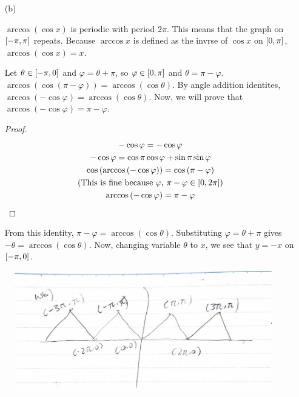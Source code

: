 \documentclass{article}
\begin{document}
\begin{multicols}{2}
\begin{itemize}
	\item[(b)]
	\begin{flushleft}	
	$\arccos\left(\cos x\right)$ is periodic with period $2\pi$.
	This means that the graph on $\interval[scaled]{-\pi}{\pi}$
	repeats. Because $\arccos x$ is defined as the invrse of
	$\cos x$ on $\interval[scaled]{0}{\pi}$, $\arccos\left(
	\cos x\right)=x$.
	
	Let $\theta\in\interval[scaled]{-\pi}{0}$ and
	$\varphi=\theta+\pi$, so $\varphi\in\interval[scaled]
	{0}{\pi}$ and $\theta=\pi-\varphi$. $\arccos\left(\cos\left(
	\pi-\varphi\right)\right)=\arccos\left(\cos\theta\right)$. By
	angle addition identites, $\arccos\left(-\cos\varphi\right)=
	\arccos\left(\cos\theta\right)$. Now, we will prove that
	$\arccos\left(-\cos\varphi\right)=\pi-\varphi$.
	\end{flushleft}
	\begin{proof}
		\begin{gather*}
			-\cos\varphi=-\cos\varphi \\
			-\cos\varphi=\cos\pi\cos\varphi+\sin\pi\sin\varphi \\
			\cos\left(\arccos\left(-\cos\varphi\right)\right)
			=\cos\left(\pi-\varphi\right) \\
			\text{(This is fine because
			$\varphi$, $\pi-\varphi\in\interval[scaled]{0}{2\pi}$)} \\
			\arccos\left(-\cos\varphi\right)=\pi-\varphi
		\end{gather*}
	\end{proof}
	\begin{flushleft}
	From this identity, $\pi-\varphi=\arccos\left(\cos\theta
	\right)$. Substituting $\varphi=\theta+\pi$ gives $-\theta=
	\arccos\left(\cos\theta\right)$. Now, changing variable
	$\theta$ to $x$, we see that $y=-x$ on $\interval[scaled]
	{-\pi}{0}$.
	\end{flushleft}
\end{itemize}
\end{multicols}

\begin{figure}[H]
	\centering
	\includegraphics[height=0.3\textheight]{ps34q10b.png}
\end{figure}
\end{document}
